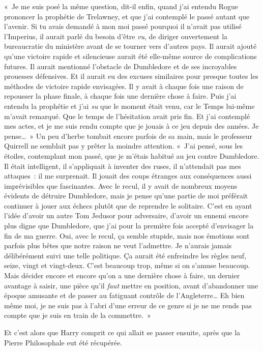 «~Je me suis posé la même question, dit-il enfin, quand j'ai entendu Rogue prononcer la prophétie de Trelawney, et que j'ai contemplé le passé autant que l'avenir. Si tu avais demandé à mon moi passé pourquoi il n'avait pas utilisé l'Imperius, il aurait parlé du besoin d'être \emph{vu}, de diriger ouvertement la bureaucratie du ministère avant de se tourner vers d'autres pays. Il aurait ajouté qu'une victoire rapide et silencieuse aurait été elle-même source de complications futures. Il aurait mentionné l'obstacle de Dumbledore et de ses incroyables prouesses défensives. Et il aurait eu des excuses similaires pour presque toutes les méthodes de victoire rapide envisagées. Il y avait à chaque fois une raison de repousser la phase finale, à chaque fois une dernière chose à faire. Puis j'ai entendu la prophétie et j'ai \emph{su} que le moment était venu, car le Temps lui-même m'avait remarqué. Que le temps de l'hésitation avait pris fin. Et j'ai contemplé mes actes, et je me suis rendu compte que je jouais à ce jeu depuis des années. Je pense…~» Un peu d'herbe tombait encore parfois de sa main, mais le professeur Quirrell ne semblait pas y prêter la moindre attention. «~J'ai pensé, sous les étoiles, contemplant mon passé, que je m'étais habitué au jeu contre Dumbledore. Il était intelligent, il s'appliquait à inventer des ruses, il n'attendait pas mes attaques~: il me surprenait. Il jouait des coups étranges aux conséquences aussi imprévisibles que fascinantes. Avec le recul, il y avait de nombreux moyens évidents de détruire Dumbledore, mais je pense qu'une partie de moi préférait continuer à jouer aux échecs plutôt que de reprendre le solitaire. C'est en ayant l'idée d'avoir un autre Tom Jedusor pour adversaire, d'avoir un ennemi encore plus digne que Dumbledore, que j'ai pour la première fois accepté d'envisager la fin de ma guerre. Oui, avec le recul, ça semble stupide, mais nos émotions sont parfois plus bêtes que notre raison ne veut l'admettre. Je n'aurais jamais délibérément suivi une telle politique. Ça aurait été enfreindre les règles neuf, seize, vingt et vingt-deux. C'est beaucoup trop, même si on s'amuse beaucoup. Mais décider encore et encore qu'on a une dernière chose à faire, un dernier avantage à saisir, une pièce qu'il \emph{faut} mettre en position, avant d'abandonner une époque amusante et de passer au fatiguant contrôle de l'Angleterre… Eh bien même moi, je ne suis pas à l'abri d'une erreur de ce genre si je ne me rends pas compte que je suis en train de la commettre.~»

Et c'est alors que Harry comprit ce qui allait se passer ensuite, après que la Pierre Philosophale eut été récupérée.

